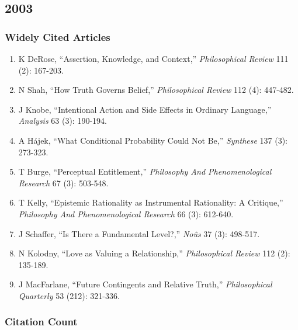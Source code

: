 \documentclass[
  10pt,
  letterpaper,
  DIV=11,
  numbers=noendperiod,
  twoside]{scrartcl}
\providecommand{\tightlist}{%
  \setlength{\itemsep}{0pt}\setlength{\parskip}{0pt}}\usepackage{longtable,booktabs,array}
\begin{document}
\newpage

\subsection{2003}\label{sec-s2003}

\subsubsection*{Widely Cited Articles}\label{widely-cited-articles-27}

\begin{enumerate}
\def\labelenumi{\arabic{enumi}.}
\tightlist
\item
  K DeRose, ``Assertion, Knowledge, and Context,'' \emph{Philosophical
  Review} 111 (2): 167-203.
\item
  N Shah, ``How Truth Governs Belief,'' \emph{Philosophical Review} 112
  (4): 447-482.
\item
  J Knobe, ``Intentional Action and Side Effects in Ordinary Language,''
  \emph{Analysis} 63 (3): 190-194.
\item
  A Hájek, ``What Conditional Probability Could Not Be,''
  \emph{Synthese} 137 (3): 273-323.
\item
  T Burge, ``Perceptual Entitlement,'' \emph{Philosophy And
  Phenomenological Research} 67 (3): 503-548.
\item
  T Kelly, ``Epistemic Rationality as Instrumental Rationality: A
  Critique,'' \emph{Philosophy And Phenomenological Research} 66 (3):
  612-640.
\item
  J Schaffer, ``Is There a Fundamental Level?,'' \emph{Noûs} 37 (3):
  498-517.
\item
  N Kolodny, ``Love as Valuing a Relationship,'' \emph{Philosophical
  Review} 112 (2): 135-189.
\item
  J MacFarlane, ``Future Contingents and Relative Truth,''
  \emph{Philosophical Quarterly} 53 (212): 321-336.
\end{enumerate}

\subsubsection*{Citation Count}\label{sec-count-2003}
\end{document}
